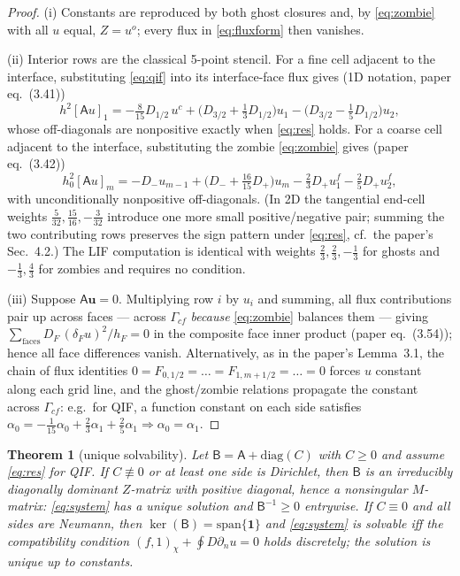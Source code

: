 \documentclass[11pt]{article}
\newtheorem{theorem}{Theorem}[section]
\theoremstyle{remark}
\newcommand{\ip}[2]{\left(#1,#2\right)_\chi}
\begin{document}
\begin{proof}
(i) Constants are reproduced by both ghost closures and, by
\eqref{eq:zombie} with all $u$ equal, $Z=u^o$; every flux in
\eqref{eq:fluxform} then vanishes.

(ii) Interior rows are the classical 5-point stencil.  For a fine cell
adjacent to the interface, substituting \eqref{eq:qif} into its
interface-face flux gives (1D notation, paper eq.~(3.41))
\[
  h^2[\mathsf A u]_{1}
  = -\tfrac{8}{15}D_{1/2}\,u^{c}
  + \bigl(D_{3/2}+\tfrac13 D_{1/2}\bigr)u_{1}
  - \bigl(D_{3/2}-\tfrac15 D_{1/2}\bigr)u_{2},
\]
whose off-diagonals are nonpositive exactly when \eqref{eq:res} holds.
For a coarse cell adjacent to the interface, substituting the zombie
\eqref{eq:zombie} gives (paper eq.~(3.42))
\[
  h_0^2[\mathsf A u]_{m}
  = -D_{-}u_{m-1}
  + \bigl(D_{-}+\tfrac{16}{15}D_{+}\bigr)u_{m}
  - \tfrac23 D_{+}u^{f}_{1} - \tfrac25 D_{+}u^{f}_{2},
\]
with unconditionally nonpositive off-diagonals.  (In 2D the tangential
end-cell weights $\tfrac5{32},\tfrac{15}{16},-\tfrac3{32}$ introduce one
more small positive/negative pair; summing the two contributing rows
preserves the sign pattern under \eqref{eq:res}, cf.\ the paper's
Sec.~4.2.)  The LIF computation is identical with weights
$\tfrac23,\tfrac23,-\tfrac13$ for ghosts and
$-\tfrac13,\tfrac43$ for zombies and requires no condition.

(iii) Suppose $\mathsf A\mathbf u=0$.  Multiplying row $i$ by $u_i$ and
summing, all flux contributions pair up across faces --- across
$\Gamma_{cf}$ \emph{because} \eqref{eq:zombie} balances them --- giving
$\sum_{\text{faces}} D_F\,(\delta_F u)^2/h_F = 0$ in the composite face
inner product (paper eq.~(3.54)); hence all face differences vanish.
Alternatively, as in the paper's Lemma~3.1, the chain of flux identities
$0=F_{0,1/2}=\dots=F_{1,m+1/2}=\dots=0$ forces $u$ constant along each
grid line, and the ghost/zombie relations propagate the constant across
$\Gamma_{cf}$: e.g.\ for QIF, a function constant on each side satisfies
$\alpha_0=-\tfrac1{15}\alpha_0+\tfrac23\alpha_1+\tfrac25\alpha_1
\Rightarrow\alpha_0=\alpha_1$.
\end{proof}

\begin{theorem}[unique solvability]\label{thm:solv}
Let $\mathsf B=\mathsf A+\mathrm{diag}(C)$ with $C\ge0$ and assume
\eqref{eq:res} for QIF\@.  If $C\not\equiv0$ or at least one side is
Dirichlet, then $\mathsf B$ is an irreducibly diagonally dominant
$Z$-matrix with positive diagonal, hence a nonsingular $M$-matrix:
\eqref{eq:system} has a unique solution and $\mathsf B^{-1}\ge 0$
entrywise.  If $C\equiv 0$ and all sides are Neumann, then
$\ker(\mathsf B)=\mathrm{span}\{\mathbf 1\}$ and \eqref{eq:system} is
solvable iff the compatibility condition
$\ip{f}{1}+\oint D\partial_n u = 0$ holds discretely; the solution is
unique up to constants.
\end{theorem}
\end{document}

